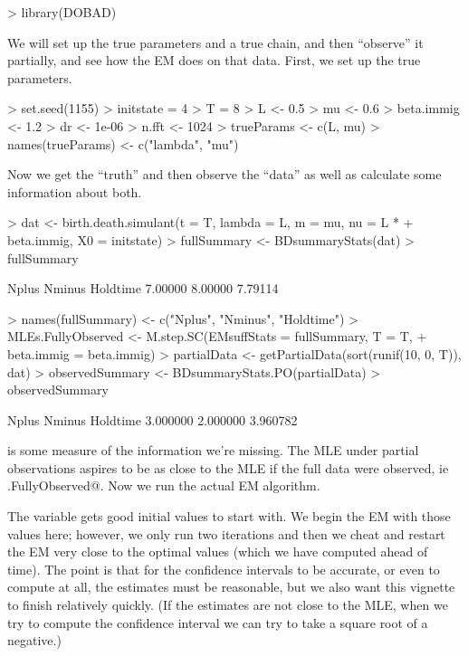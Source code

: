 \documentclass[12pt]{article}
\begin{document}
\begin{Schunk}
\begin{Sinput}
> library(DOBAD)
\end{Sinput}
\end{Schunk}
We will set up the true parameters and a true chain, and then ``observe'' it
partially, and see how the EM does on that data.
First, we set up the true parameters.
\begin{Schunk}
\begin{Sinput}
> set.seed(1155)
> initstate = 4
> T = 8
> L <- 0.5
> mu <- 0.6
> beta.immig <- 1.2
> dr <- 1e-06
> n.fft <- 1024
> trueParams <- c(L, mu)
> names(trueParams) <- c("lambda", "mu")
\end{Sinput}
\end{Schunk}
Now we get the ``truth'' and then observe the ``data''
as well as calculate some information about both.
\begin{Schunk}
\begin{Sinput}
> dat <- birth.death.simulant(t = T, lambda = L, m = mu, nu = L * 
+    beta.immig, X0 = initstate)
> fullSummary <- BDsummaryStats(dat)
> fullSummary
\end{Sinput}
\begin{Soutput}
   Nplus   Nminus Holdtime 
 7.00000  8.00000  7.79114 
\end{Soutput}
\begin{Sinput}
> names(fullSummary) <- c("Nplus", "Nminus", "Holdtime")
> MLEs.FullyObserved <- M.step.SC(EMsuffStats = fullSummary, T = T, 
+    beta.immig = beta.immig)
> partialData <- getPartialData(sort(runif(10, 0, T)), dat)
> observedSummary <- BDsummaryStats.PO(partialData)
> observedSummary
\end{Sinput}
\begin{Soutput}
   Nplus   Nminus Holdtime 
3.000000 2.000000 3.960782 
\end{Soutput}
\end{Schunk}
\verb@observedSummary@ is some measure of the information we're
missing.  The MLE under partial observations aspires to be as close to
the MLE if the full data were observed, ie \verb@MLEs.FullyObserved@.
Now we run the actual EM algorithm.  

The variable \verb@initParamMat@ gets good initial values to start
with.  We begin the EM with those values here; however, we only run
two iterations and then we cheat and restart the EM very close to the
optimal values (which we have computed ahead of time).  The point is
that for the confidence intervals to be accurate, or even to compute
at all, the estimates must be reasonable, but we also want this
vignette to finish relatively quickly.  (If the estimates are not
close to the MLE, when we try to compute the confidence interval we
can try to take a square root of a negative.)
\end{document}
